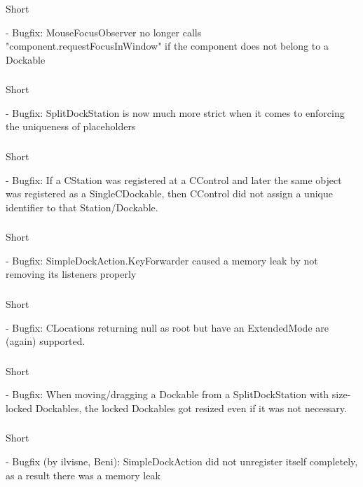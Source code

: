 \documentclass[a4paper,10pt]{article}
\newcommand{\short}{\item[Short]}
\begin{document}
\subsubsection{}
\begin{description}
 \short 
\end{description}
- Bugfix: MouseFocusObserver no longer calls "component.requestFocusInWindow" if the component does not belong to a Dockable
\subsubsection{}
\begin{description}
 \short 
\end{description}
- Bugfix: SplitDockStation is now much more strict when it comes to enforcing the uniqueness of placeholders
\subsubsection{}
\begin{description}
 \short 
\end{description}
- Bugfix: If a CStation was registered at a CControl and later the same object was registered as a SingleCDockable, then CControl did not assign a unique identifier to that Station/Dockable.
\subsubsection{}
\begin{description}
 \short 
\end{description}
- Bugfix: SimpleDockAction.KeyForwarder caused a memory leak by not removing its listeners properly
\subsubsection{}
\begin{description}
 \short 
\end{description}
- Bugfix: CLocations returning null as root but have an ExtendedMode are (again) supported.
\subsubsection{}
\begin{description}
 \short 
\end{description}
- Bugfix: When moving/dragging a Dockable from a SplitDockStation with size-locked Dockables, the locked Dockables got resized even if it was not necessary.
\subsubsection{}
\begin{description}
 \short 
\end{description}
- Bugfix (by ilvisne, Beni): SimpleDockAction did not unregister itself completely, as a result there was a memory leak
\end{document}
